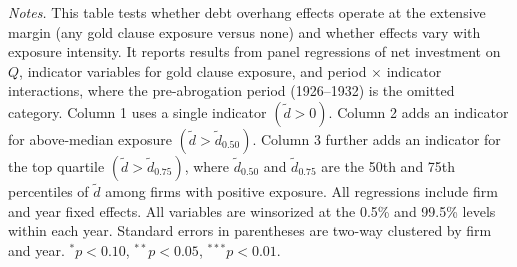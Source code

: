 \begin{table}[p]
\vspace*{3mm} \justifying \noindent
\scriptsize{\textit{Notes.} This table tests whether debt overhang effects operate at the extensive margin (any gold clause exposure versus none) and whether effects vary with exposure intensity. It reports results from panel regressions of net investment on $Q$, indicator variables for gold clause exposure, and period $\times$ indicator interactions, where the pre-abrogation period (1926--1932) is the omitted category. Column 1 uses a single indicator $(\tilde{d} > 0)$. Column 2 adds an indicator for above-median exposure $(\tilde{d} > \tilde{d}_{0.50})$. Column 3 further adds an indicator for the top quartile $(\tilde{d} > \tilde{d}_{0.75})$, where $\tilde{d}_{0.50}$ and $\tilde{d}_{0.75}$ are the 50th and 75th percentiles of $\tilde{d}$ among firms with positive exposure. All regressions include firm and year fixed effects. All variables are winsorized at the 0.5\% and 99.5\% levels within each year. Standard errors in parentheses are two-way clustered by firm and year. $^{*}p<0.10$, $^{**}p<0.05$, $^{***}p<0.01$.}
\end{table}